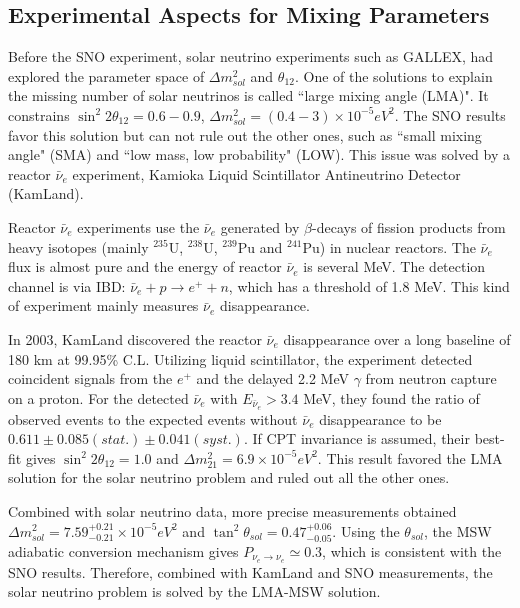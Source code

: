\documentclass[preprint,12pt]{elsarticle}
\numberwithin{equation}{section}
\begin{document}
\subsection{Experimental Aspects for Mixing Parameters}

Before the SNO experiment, solar neutrino experiments such as GALLEX, had explored the parameter space of $\Delta m^2_{sol}$ and $\theta_{12}$. One of the solutions to explain the missing number of solar neutrinos is called ``large mixing angle (LMA)". It constrains $\sin^2 2\theta_{12}=0.6-0.9$, $\Delta m^2_{sol}=(0.4-3)\times 10^{-5} eV^2$. The SNO results favor this solution but can not rule out the other ones, such as ``small mixing angle" (SMA) and ``low mass, low probability" (LOW)\cite{japan_text}. This issue was solved by a reactor $\bar{\nu}_e$ experiment, Kamioka Liquid Scintillator Antineutrino Detector (KamLand).

Reactor $\bar{\nu}_e$ experiments use the $\bar{\nu}_e$ generated by $\beta$-decays of fission products from heavy isotopes (mainly $^{235}$U, $^{238}$U, $^{239}$Pu and $^{241}$Pu) in nuclear reactors. The $\bar{\nu}_e$ flux is almost pure and the energy of reactor $\bar{\nu}_e$ is several MeV. The detection channel is via IBD: $\bar{\nu}_e+p\to e^+ + n$, which has a threshold of 1.8 MeV. This kind of experiment mainly measures $\bar{\nu}_e$ disappearance\cite{pdg2018}.

In 2003, KamLand discovered the reactor $\bar{\nu}_e$ disappearance over a long baseline of 180 km at 99.95\% C.L. Utilizing liquid scintillator, the experiment detected coincident signals from the $e^+$ and the delayed 2.2 MeV $\gamma$ from neutron capture on a proton. For the detected $\bar{\nu}_e$ with $E_{\bar{\nu}_e}>3.4$ MeV, they found the ratio of observed events to the expected events without $\bar{\nu}_e$ disappearance to be $0.611\pm0.085(stat.)\pm0.041(syst.)$\cite{kamland}. If CPT invariance is assumed, their best-fit gives $\sin^2 2\theta_{12}=1.0$ and $\Delta m^2_{21}=6.9\times10^{-5} eV^2$. This result favored the LMA solution for the solar neutrino problem and ruled out all the other ones\cite{kamland}. 

Combined with solar neutrino data, more precise measurements obtained $\Delta m^2_{sol} = 7.59^{+0.21}_{-0.21}\times 10^{-5}eV^2$ and $\tan^2{\theta}_{sol}=0.47^{+0.06}_{-0.05}$\cite{kamland_measure}.
Using the ${\theta}_{sol}$, the MSW adiabatic conversion mechanism gives $P_{\nu_e\to\nu_e}\simeq 0.3$, which is consistent with the SNO results. Therefore, combined with KamLand and SNO measurements, the solar neutrino problem is solved by the LMA-MSW solution.
\end{document}
